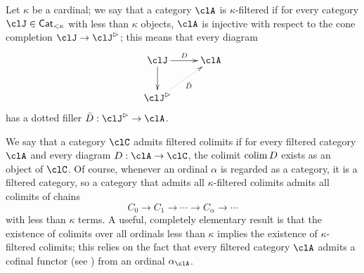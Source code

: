 Let $\kappa$ be a cardinal; we say that a category $\clA$ is $\kappa$\hyp{}filtered if for every category $\clJ\in\Qat_{<\kappa}$ with less than $\kappa$ objects, $\clA$ is injective with respect to the cone completion $\clJ\to \clJ^\rhd$; this means that every diagram
\[
	\vcenter{\xymatrix{
			\clJ\ar[d]\ar[r]^D & \clA \\
			\clJ^\rhd\ar@{.>}[ur]_{\bar D}
		}}
\]
has a dotted filler $\bar D : \clJ^\rhd \to \clA$.

We say that a category $\clC$ admits filtered colimits if for every filtered category $\clA$ and every diagram $D : \clA \to \clC$, the colimit $\operatorname{colim} D$ exists as an object of $\clC$. Of course, whenever an ordinal $\alpha$ is regarded as a category, it is a filtered category, so a category that admits all $\kappa$\hyp{}filtered colimits admits all colimits of chains
\[
	C_0 \to C_1 \to \cdots \to C_\alpha \to\cdots
\]
with less than $\kappa$ terms. A useful, completely elementary result is that the existence of colimits over all ordinals less than $\kappa$ implies the existence of $\kappa$\hyp{}filtered colimits; this relies on the fact that every filtered category $\clA$ admits a cofinal functor (see \cite[]{Bor1}) from an ordinal $\alpha_\clA$.

